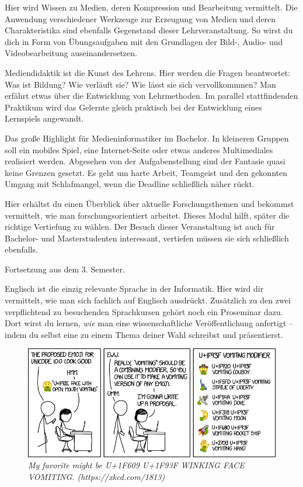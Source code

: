 Hier wird Wissen zu Medien, deren Kompression und Bearbeitung vermittelt.
Die Anwendung verschiedener Werkzeuge zur Erzeugung von Medien und deren Charakteristika sind ebenfalls Gegenstand dieser Lehrveranstaltung.
So wirst du dich in Form von Übungsaufgaben mit den Grundlagen der Bild-, Audio- und Videobearbeitung auseinandersetzen.

Mediendidaktik ist die \glqq Kunst des Lehrens\grqq.
Hier werden die Fragen beantwortet:
Was ist Bildung?
Wie verläuft sie?
Wie lässt sie sich vervollkommnen?
Man erfährt etwas über die Entwicklung von Lehrmethoden.
Im parallel stattfindenden Praktikum wird das Gelernte gleich praktisch bei der Entwicklung eines Lernspiels angewandt.

Das große Highlight für Medieninformatiker im Bachelor.
In kleineren Gruppen soll ein mobiles Spiel, eine Internet-Seite oder etwas anderes Multimediales realisiert werden.
Abgesehen von der Aufgabenstellung sind der Fantasie quasi keine Grenzen gesetzt.
Es geht um harte Arbeit, Teamgeist und den gekonnten Umgang mit Schlafmangel, wenn die Deadline schließlich näher rückt.

Hier erhältst du einen Überblick über aktuelle Forschungsthemen und bekommst vermittelt, wie man forschungsorientiert arbeitet.
Dieses Modul hilft, später die richtige Vertiefung zu wählen. Der Besuch dieser Veranstaltung ist auch für Bachelor- und Masterstudenten interessant, vertiefen müssen sie sich schließlich ebenfalls.

Fortsetzung aus dem 3. Semester.

Englisch ist die einzig relevante Sprache in der Informatik.
Hier wird dir vermittelt, wie man sich fachlich auf Englisch ausdrückt. 
Zusätzlich zu den zwei verpflichtend zu besuchenden Sprachkursen gehört noch ein Proseminar dazu.
Dort wirst du lernen, \textit{wie} man eine wissenschaftliche Veröffentlichung anfertigt -- indem du selbst eine zu einem Thema deiner Wahl schreibst und präsentierst.

\begin{figure}[b!]
\centering
\includegraphics[scale=.4]{img/xkcd/vomiting_emoji.png}
\caption*{{\small \textit{My favorite might be U+1F609 U+1F93F WINKING FACE VOMITING. (https://xkcd.com/1813)}}}
\end{figure}

